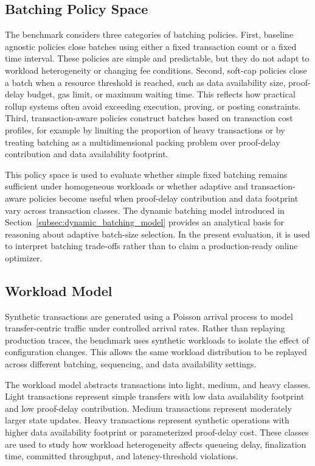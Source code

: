 \begin{itemize}[leftmargin=1.5em]
\subsection{Batching Policy Space}

The benchmark considers three categories of batching policies. First, baseline agnostic policies close batches using either a fixed transaction count or a fixed time interval. These policies are simple and predictable, but they do not adapt to workload heterogeneity or changing fee conditions. Second, soft-cap policies close a batch when a resource threshold is reached, such as data availability size, proof-delay budget, gas limit, or maximum waiting time. This reflects how practical rollup systems often avoid exceeding execution, proving, or posting constraints. Third, transaction-aware policies construct batches based on transaction cost profiles, for example by limiting the proportion of heavy transactions or by treating batching as a multidimensional packing problem over proof-delay contribution and data availability footprint.

This policy space is used to evaluate whether simple fixed batching remains sufficient under homogeneous workloads or whether adaptive and transaction-aware policies become useful when proof-delay contribution and data footprint vary across transaction classes. The dynamic batching model introduced in Section~\ref{subsec:dynamic_batching_model} provides an analytical basis for reasoning about adaptive batch-size selection. In the present evaluation, it is used to interpret batching trade-offs rather than to claim a production-ready online optimizer.

\subsection{Workload Model}

Synthetic transactions are generated using a Poisson arrival process to model transfer-centric traffic under controlled arrival rates. Rather than replaying production traces, the benchmark uses synthetic workloads to isolate the effect of configuration changes. This allows the same workload distribution to be replayed across different batching, sequencing, and data availability settings.

The workload model abstracts transactions into light, medium, and heavy classes. Light transactions represent simple transfers with low data availability footprint and low proof-delay contribution. Medium transactions represent moderately larger state updates. Heavy transactions represent synthetic operations with higher data availability footprint or parameterized proof-delay cost. These classes are used to study how workload heterogeneity affects queueing delay, finalization time, committed throughput, and latency-threshold violations.


\end{itemize}
